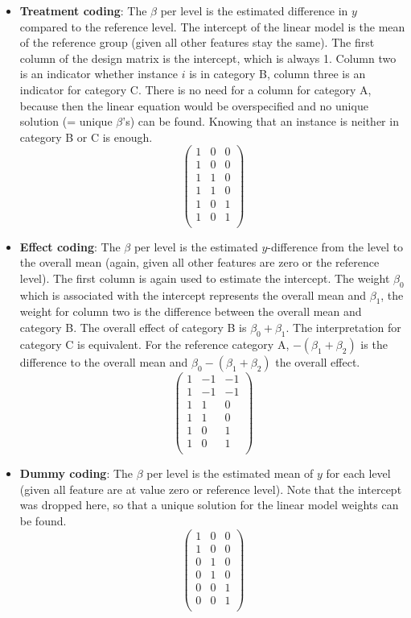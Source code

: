 \documentclass[12pt,]{krantz}
\providecommand{\tightlist}{%
  \setlength{\itemsep}{0pt}\setlength{\parskip}{0pt}}
\theoremstyle{definition}
\theoremstyle{definition}
\theoremstyle{definition}
\theoremstyle{remark}
\begin{document}
\begin{itemize}
\tightlist
\item
  \textbf{Treatment coding}: The \(\beta\) per level is the estimated
  difference in \(y\) compared to the reference level. The intercept of
  the linear model is the mean of the reference group (given all other
  features stay the same). The first column of the design matrix is the
  intercept, which is always 1. Column two is an indicator whether
  instance \(i\) is in category B, column three is an indicator for
  category C. There is no need for a column for category A, because then
  the linear equation would be overspecified and no unique solution (=
  unique \(\beta\)'s) can be found. Knowing that an instance is neither
  in category B or C is enough. \[
  \begin{pmatrix}
  1 & 0 & 0 \\
  1 & 0 & 0 \\
  1 & 1 & 0 \\
  1 & 1 & 0 \\
  1 & 0 & 1 \\
  1 & 0 & 1 \\
  \end{pmatrix}
  \]
\item
  \textbf{Effect coding}: The \(\beta\) per level is the estimated
  \(y\)-difference from the level to the overall mean (again, given all
  other features are zero or the reference level). The first column is
  again used to estimate the intercept. The weight \(\beta_{0}\) which
  is associated with the intercept represents the overall mean and
  \(\beta_{1}\), the weight for column two is the difference between the
  overall mean and category B. The overall effect of category B is
  \(\beta_{0} + \beta_{1}\). The interpretation for category C is
  equivalent. For the reference category A, \(-(\beta_{1} + \beta_{2})\)
  is the difference to the overall mean and
  \(\beta_{0} -(\beta_{1} + \beta_{2})\) the overall effect. \[
  \begin{pmatrix}
  1 & -1 & -1 \\
  1 & -1 & -1 \\
  1 & 1 & 0 \\
  1 & 1 & 0 \\
  1 & 0 & 1 \\
  1 & 0 & 1 \\
  \end{pmatrix}
  \]
\item
  \textbf{Dummy coding}: The \(\beta\) per level is the estimated mean
  of \(y\) for each level (given all feature are at value zero or
  reference level). Note that the intercept was dropped here, so that a
  unique solution for the linear model weights can be found. \[
  \begin{pmatrix}
  1 & 0 & 0 \\
  1 & 0 & 0 \\
  0 & 1 & 0 \\
  0 & 1 & 0 \\
  0 & 0 & 1 \\
  0 & 0 & 1 \\
  \end{pmatrix}
  \]
\end{itemize}
\end{document}
